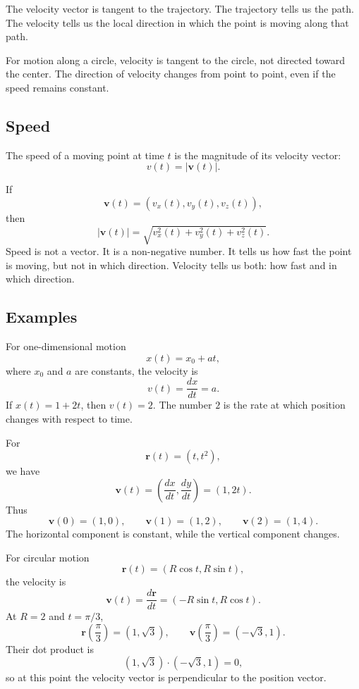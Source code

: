 The velocity vector is tangent to the trajectory. The trajectory tells us the path. The velocity tells us the local direction in which the point is moving along that path.

\begin{remarkbox}
For motion along a circle, velocity is tangent to the circle, not directed toward the center. The direction of velocity changes from point to point, even if the speed remains constant.
\end{remarkbox}

\subsection{Speed}

\begin{definitionbox}
The speed of a moving point at time \(t\) is the magnitude of its velocity vector:
\[
v(t)=|\mathbf{v}(t)|.
\]
\end{definitionbox}

If
\[
\mathbf{v}(t)=(v_x(t),v_y(t),v_z(t)),
\]
then
\[
|\mathbf{v}(t)|=\sqrt{v_x^2(t)+v_y^2(t)+v_z^2(t)}.
\]
Speed is not a vector. It is a non-negative number. It tells us how fast the point is moving, but not in which direction. Velocity tells us both: how fast and in which direction.

\subsection{Examples}

\begin{examplebox}
For one-dimensional motion
\[
x(t)=x_0+at,
\]
where \(x_0\) and \(a\) are constants, the velocity is
\[
v(t)=\frac{dx}{dt}=a.
\]
If \(x(t)=1+2t\), then \(v(t)=2\). The number \(2\) is the rate at which position changes with respect to time.
\end{examplebox}

\begin{examplebox}
For
\[
\mathbf{r}(t)=(t,t^2),
\]
we have
\[
\mathbf{v}(t)=\left(\frac{dx}{dt},\frac{dy}{dt}\right)=(1,2t).
\]
Thus
\[
\mathbf{v}(0)=(1,0),\qquad \mathbf{v}(1)=(1,2),\qquad \mathbf{v}(2)=(1,4).
\]
The horizontal component is constant, while the vertical component changes.
\end{examplebox}

\begin{examplebox}
For circular motion
\[
\mathbf{r}(t)=(R\cos t,R\sin t),
\]
the velocity is
\[
\mathbf{v}(t)=\frac{d\mathbf{r}}{dt}=(-R\sin t,R\cos t).
\]
At \(R=2\) and \(t=\pi/3\),
\[
\mathbf{r}\left(\frac{\pi}{3}\right)=(1,\sqrt{3}),
\qquad
\mathbf{v}\left(\frac{\pi}{3}\right)=(-\sqrt{3},1).
\]
Their dot product is
\[
(1,\sqrt{3})\cdot(-\sqrt{3},1)=0,
\]
so at this point the velocity vector is perpendicular to the position vector.
\end{examplebox}

